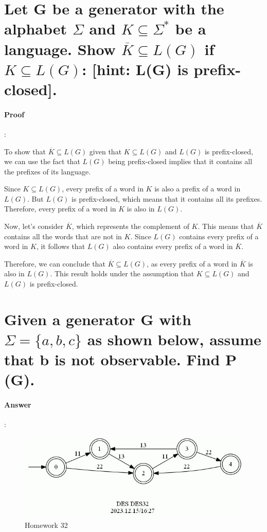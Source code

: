 \documentclass{article}
\begin{document}
\section{Let G be a generator with the alphabet $\Sigma$ and $K \subseteq \Sigma^*$ be a language. Show $\overline{K} \subseteq L(G)$ if $K \subseteq L(G)$: [hint: L(G) is prefix-closed].}

\paragraph{Proof}:

To show that $\overline{K} \subseteq L(G)$ given that $K \subseteq L(G)$ and $L(G)$ is prefix-closed, we can use the fact that $L(G)$ being prefix-closed implies that it contains all the prefixes of its language. 

Since $K \subseteq L(G)$, every prefix of a word in $K$ is also a prefix of a word in $L(G)$. But $L(G)$ is prefix-closed, which means that it contains all its prefixes. Therefore, every prefix of a word in $K$ is also in $L(G)$. 

Now, let's consider $\overline{K}$, which represents the complement of $K$. This means that $\overline{K}$ contains all the words that are not in $K$. Since $L(G)$ contains every prefix of a word in $K$, it follows that $L(G)$ also contains every prefix of a word in $\overline{K}$. 

Therefore, we can conclude that $\overline{K} \subseteq L(G)$, as every prefix of a word in $\overline{K}$ is also in $L(G)$. This result holds under the assumption that $K \subseteq L(G)$ and $L(G)$ is prefix-closed.



\section{Given a generator G with $\Sigma = \{a, b, c\}$ as shown below, assume that b is not observable. Find P (G).}

\paragraph{Answer}:

\begin{figure}[h]
  \centering
  \includegraphics{assets/DES32.jpg}
  \caption{Homework 32}
  \label{fig:des32}
\end{figure}
\end{document}
